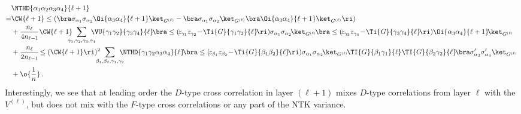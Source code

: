 \begin{align}\label{eq:D-recursion}
&\NTHD{\alpha_1\alpha_2\alpha_3\alpha_4}{\ell+1}\, \\
=&\CW{\ell+1} \le(\bra \sigma_{\alpha_1}\sigma_{\alpha_2}\Oi{\alpha_3\alpha_4}{\ell+1} \ket_{G^{(\ell)}}-\bra \sigma_{\alpha_1}\sigma_{\alpha_2}\ket_{G^{(\ell)}}\bra\Oi{\alpha_3\alpha_4}{\ell+1} \ket_{G^{(\ell)}}\ri)\, \nonumber\\
&+\frac{n_{\ell}}{4n_{\ell-1}} \CW{\ell+1} \!\!\!\!\!\sum_{\gamma_1, \gamma_2, \gamma_3, \gamma_4} \!\!\!\!\!
\VU{\gamma_1 \gamma_2}{\gamma_3 \gamma_4}{\ell}\!
\bra\le(\!z_{\gamma_1} z_{\gamma_2} \!-\!\Ti{G}{\gamma_1 \gamma_2}{\ell} \!\ri)\sigma_{\alpha_1}\sigma_{\alpha_2}\!\ket_{G^{(\ell)}}\!\bra\le(\!z_{\gamma_3} z_{\gamma_4} \!-\!\Ti{G}{\gamma_3 \gamma_4}{\ell} \!\ri)\Oi{\alpha_3\alpha_4}{\ell+1}\!\ket_{G^{(\ell)}}\, \nonumber\\
&+\frac{n_{\ell}}{2n_{\ell-1}}\!\le(\CW{\ell+1}\ri)^2\!\!\!\!\!\sum_{\beta_1,\beta_2,\gamma_1,\gamma_2}\!\!\!\!\!\NTHD{\gamma_1\gamma_2\alpha_3\alpha_4}{\ell}\!\bra\le(\!z_{\beta_1}z_{\beta_2}\!-\!\Ti{G}{\beta_1\beta_2}{\ell}\!\ri) \sigma_{\alpha_1}\sigma_{\alpha_2}\!\ket_{G^{(\ell)}}\!\TI{G}{\beta_1\gamma_1}{\ell}\TI{G}{\beta_2\gamma_2}{\ell}\!\bra \sigma^{\prime}_{\alpha_3}\sigma^{\prime}_{\alpha_4}\ket_{G^{(\ell)}}\, \notag \\ &+\o{\frac{1}{n}}\, .\nonumber
\end{align}
Interestingly, we see that at leading order the $D$-type cross correlation in layer $(\ell+1)$ mixes $D$-type correlations from layer $\ell$ with the  $V^{(\ell)}$, but does not mix with the $F$-type cross correlations or any part of the NTK variance.


